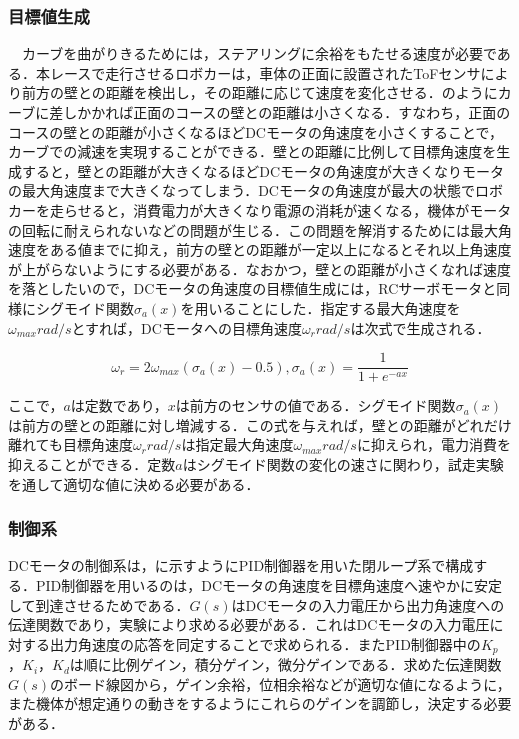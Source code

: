 \subsubsection{目標値生成}
　カーブを曲がりきるためには，ステアリングに余裕をもたせる速度が必要である．本レースで走行させるロボカーは，車体の正面に設置されたToFセンサにより前方の壁との距離を検出し，その距離に応じて速度を変化させる．のようにカーブに差しかかれば正面のコースの壁との距離は小さくなる．すなわち，正面のコースの壁との距離が小さくなるほどDCモータの角速度を小さくすることで，カーブでの減速を実現することができる．壁との距離に比例して目標角速度を生成すると，壁との距離が大きくなるほどDCモータの角速度が大きくなりモータの最大角速度まで大きくなってしまう．DCモータの角速度が最大の状態でロボカーを走らせると，消費電力が大きくなり電源の消耗が速くなる，機体がモータの回転に耐えられないなどの問題が生じる．この問題を解消するためには最大角速度をある値までに抑え，前方の壁との距離が一定以上になるとそれ以上角速度が上がらないようにする必要がある．なおかつ，壁との距離が小さくなれば速度を落としたいので，DCモータの角速度の目標値生成には，RCサーボモータと同様にシグモイド関数$\sigma_{a}(x)$を用いることにした．指定する最大角速度を$\omega_{max}\unit{rad/s} $とすれば，DCモータへの目標角速度$\omega_{r}\unit{rad/s}$は次式で生成される．

\begin{equation}
 \omega_{r}=2\omega_{max}(\sigma_{a}(x)-0.5), 
 \sigma_{a}(x)=\frac{1}{1+e^{-ax}}
\end{equation}

ここで，$a$は定数であり，$x$は前方のセンサの値である．シグモイド関数$\sigma_{a}(x)$は前方の壁との距離に対し増減する．この式を与えれば，壁との距離がどれだけ離れても目標角速度$\omega_{r}\unit{rad/s}$は指定最大角速度$\omega_{max}\unit{rad/s}$に抑えられ，電力消費を抑えることができる．定数$a$はシグモイド関数の変化の速さに関わり，試走実験を通して適切な値に決める必要がある．
\subsubsection{制御系}
  DCモータの制御系は，に示すようにPID制御器を用いた閉ループ系で構成する．PID制御器を用いるのは，DCモータの角速度を目標角速度へ速やかに安定して到達させるためである．$G(s)$はDCモータの入力電圧から出力角速度への伝達関数であり，実験により求める必要がある．これはDCモータの入力電圧に対する出力角速度の応答を同定することで求められる．またPID制御器中の$K_{p}$，$K_{i}$，$K_{d}$は順に比例ゲイン，積分ゲイン，微分ゲインである．求めた伝達関数$G(s)$のボード線図から，ゲイン余裕，位相余裕などが適切な値になるように，また機体が想定通りの動きをするようにこれらのゲインを調節し，決定する必要がある．

